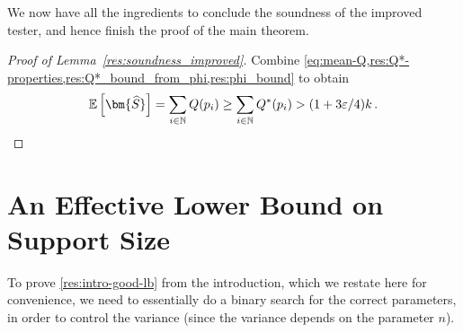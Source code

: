 \documentclass[10pt,a4paper]{article}
\newcommand{\Ex}[1]{\bE \left[ #1 \right]}
\newcommand{\bE}{\ensuremath{\mathbb{E}}}
\newcommand{\bN}{\ensuremath{\mathbb{N}}}
\renewcommand{\epsilon}{\varepsilon}
\begin{document}
We now have all the ingredients to conclude the soundness of the improved tester, and hence finish
the proof of the main theorem.

\begin{proof}[Proof of Lemma~\ref{res:soundness_improved}]
    Combine \cref{eq:mean-Q,res:Q*-properties,res:Q*_bound_from_phi,res:phi_bound} to obtain
    \[
        \Ex{\bm{\widehat S}}
        = \sum_{i \in \bN} Q(p_i)
        \ge \sum_{i \in \bN} Q^*(p_i)
        > (1 + 3\epsilon/4) k \,. \qedhere
    \]
\end{proof}

\section{An Effective Lower Bound on Support Size}
\label{section:good-lower-bound}

To prove \cref{res:intro-good-lb} from the introduction, which we restate here for convenience,
we need to essentially do a binary search for the correct parameters, in order to control the
variance (since the variance depends on the parameter $n$).
\end{document}
